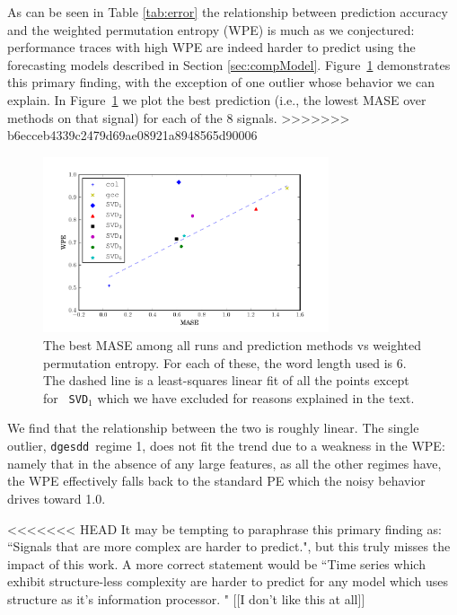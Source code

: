 \documentclass{article}
\newcommand{\svd}{{\tt dgesdd}~}
\begin{document}
As can be seen in Table \ref{tab:error} the relationship between prediction
accuracy and the weighted permutation entropy (WPE) is much as we conjectured:
performance traces with high WPE are indeed harder to predict using the
forecasting models described in Section \ref{sec:compModel}.
Figure~\ref{fig:pred_vs_wpe} demonstrates this primary finding, with the
exception of one outlier whose behavior we can explain. In
Figure~\ref{fig:pred_vs_wpe} we plot the best prediction (i.e., the lowest MASE
over methods on that signal) for each of the 8 signals.
>>>>>>> b6ecceb4339c2479d69ae08921a8948565d90006
\begin{figure}[htbp]
  \centering
  \includegraphics[width=0.75\textwidth]{figs/prediction_vs_entropy}
  \caption{The best MASE among all runs and prediction methods vs weighted
  permutation entropy. For each of these, the word length used is $6$. The
  dashed line is a least-squares linear fit of all the points except for {\tt
  SVD$_1$} which we have excluded for reasons explained in the text.}
  \label{fig:pred_vs_wpe}
\end{figure}
We find that the relationship between the two is roughly linear. The single
outlier, \svd regime 1, does not fit the trend due to a weakness in the WPE:
namely that in the absence of any large features, as all the other regimes have,
the WPE effectively falls back to the standard PE which the noisy behavior
drives toward 1.0.

<<<<<<< HEAD
It may be tempting to paraphrase this primary finding as: ``Signals that are more complex are harder to predict.", but this truly misses the impact of this work. A more correct statement would be ``Time series which exhibit structure-less complexity are harder to predict for any model which uses structure as it's information processor. " [[I don't like this at all]] 
\end{document}
